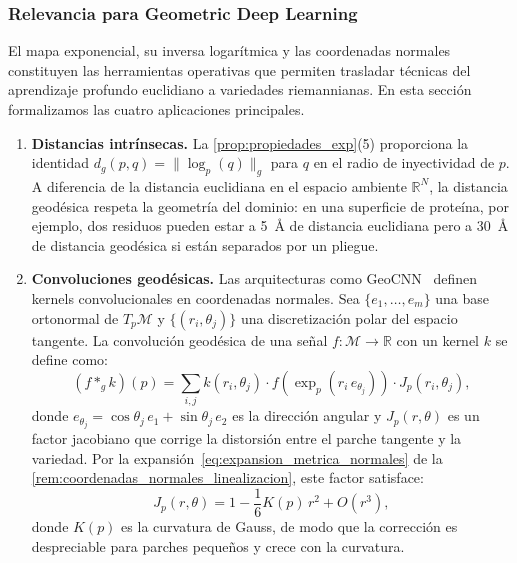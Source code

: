 \subsubsection{Relevancia para Geometric Deep Learning}\label{subsec:geodesicas_relevancia_gdl}

El mapa exponencial, su inversa logarítmica y las coordenadas normales constituyen las herramientas operativas que permiten trasladar técnicas del aprendizaje profundo euclidiano a variedades riemannianas. En esta sección formalizamos las cuatro aplicaciones principales.

\begin{remark}\label{rem:geodesicas_gdl}
\leavevmode
\begin{enumerate}
	\item \textbf{Distancias intrínsecas.} La \autoref{prop:propiedades_exp}(5) proporciona la identidad $d_g(p,q) = \|\log_p(q)\|_g$ para $q$ en el radio de inyectividad de $p$. A diferencia de la distancia euclidiana en el espacio ambiente $\mathbb{R}^N$, la distancia geodésica respeta la geometría del dominio: en una superficie de proteína, por ejemplo, dos residuos pueden estar a 5~\AA{} de distancia euclidiana pero a 30~\AA{} de distancia geodésica si están separados por un pliegue.

	\item \textbf{Convoluciones geodésicas.} Las arquitecturas como \gls{GeoCNN}~\citep{masci2015geodesic} definen kernels convolucionales en coordenadas normales. Sea $\{e_1, \ldots, e_m\}$ una base ortonormal de $T_p\mathcal{M}$ y $\{(r_i, \theta_j)\}$ una discretización polar del espacio tangente. La convolución geodésica de una señal $f: \mathcal{M} \to \mathbb{R}$ con un kernel $k$ se define como:
	\begin{equation}\label{eq:convolucion_geodesica}
	(f *_g k)(p) = \sum_{i,j} k(r_i, \theta_j) \cdot f\!\left(\exp_p(r_i \, e_{\theta_j})\right) \cdot J_p(r_i, \theta_j),
	\end{equation}
	donde $e_{\theta_j} = \cos\theta_j \, e_1 + \sin\theta_j \, e_2$ es la dirección angular y $J_p(r, \theta)$ es un factor jacobiano que corrige la distorsión entre el parche tangente y la variedad. Por la expansión~\eqref{eq:expansion_metrica_normales} de la \autoref{rem:coordenadas_normales_linealizacion}, este factor satisface:
	\[
	J_p(r, \theta) = 1 - \frac{1}{6} K(p) \, r^2 + O(r^3),
	\]
	donde $K(p)$ es la curvatura de Gauss, de modo que la corrección es despreciable para parches pequeños y crece con la curvatura.


\end{enumerate}
\end{remark}
